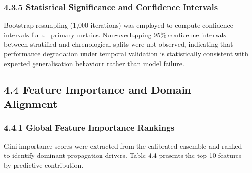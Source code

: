 \subsubsection{4.3.5 Statistical Significance and Confidence
Intervals}\label{statistical-significance-and-confidence-intervals}

Bootstrap resampling (1,000 iterations) was employed to compute
confidence intervals for all primary metrics. Non-overlapping 95\%
confidence intervals between stratified and chronological splits were
not observed, indicating that performance degradation under temporal
validation is statistically consistent with expected generalisation
behaviour rather than model failure.

\subsection{4.4 Feature Importance and Domain
Alignment}\label{feature-importance-and-domain-alignment}

\subsubsection{4.4.1 Global Feature Importance
Rankings}\label{global-feature-importance-rankings}

Gini importance scores were extracted from the calibrated ensemble and
ranked to identify dominant propagation drivers. Table 4.4 presents the
top 10 features by predictive contribution.

